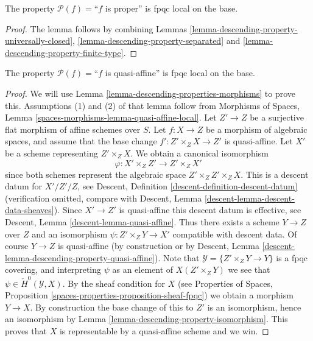 \begin{lemma}
\label{lemma-descending-property-proper}
The property $\mathcal{P}(f) =$``$f$ is proper''
is fpqc local on the base.
\end{lemma}

\begin{proof}
The lemma follows by combining
Lemmas \ref{lemma-descending-property-universally-closed},
\ref{lemma-descending-property-separated}
and \ref{lemma-descending-property-finite-type}.
\end{proof}

\begin{lemma}
\label{lemma-descending-property-quasi-affine}
The property $\mathcal{P}(f) =$``$f$ is quasi-affine''
is fpqc local on the base.
\end{lemma}

\begin{proof}
We will use
Lemma \ref{lemma-descending-properties-morphisms}
to prove this. Assumptions (1) and (2) of that lemma follow from
Morphisms of Spaces,
Lemma \ref{spaces-morphisms-lemma-quasi-affine-local}.
Let $Z' \to Z$ be a surjective flat morphism of affine schemes over $S$.
Let $f : X \to Z$ be a morphism of algebraic spaces, and assume
that the base change $f' : Z' \times_Z X \to Z'$ is quasi-affine.
Let $X'$ be a scheme representing $Z' \times_Z X$.
We obtain a canonical isomorphism
$$
\varphi : X' \times_Z Z' \longrightarrow Z' \times_Z X'
$$
since both schemes represent the algebraic space $Z' \times_Z Z' \times_Z X$.
This is a descent datum for $X'/Z'/Z$, see
Descent, Definition \ref{descent-definition-descent-datum}
(verification omitted, compare with
Descent, Lemma \ref{descent-lemma-descent-data-sheaves}).
Since $X' \to Z'$ is quasi-affine this descent datum is effective, see
Descent, Lemma \ref{descent-lemma-quasi-affine}.
Thus there exists a scheme $Y \to Z$ over $Z$ and an
isomorphism $\psi : Z' \times_Z Y \to X'$ compatible with descent data.
Of course $Y \to Z$ is quasi-affine (by construction or by
Descent, Lemma \ref{descent-lemma-descending-property-quasi-affine}).
Note that $\mathcal{Y} = \{Z' \times_Z Y \to Y\}$ is a
fpqc covering, and interpreting $\psi$ as an element of
$X(Z' \times_Z Y)$ we see that $\psi \in \check{H}^0(\mathcal{Y}, X)$.
By the sheaf condition for $X$ (see
Properties of Spaces, Proposition
\ref{spaces-properties-proposition-sheaf-fpqc})
we obtain a morphism $Y \to X$.
By construction the base change of this to $Z'$ is an isomorphism, hence
an isomorphism by
Lemma \ref{lemma-descending-property-isomorphism}.
This proves that $X$ is representable by a quasi-affine scheme and we win.
\end{proof}

